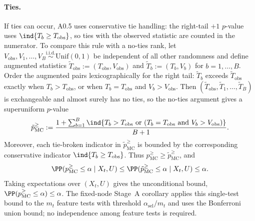 \paragraph{Ties.}
If ties can occur, A0.5 uses conservative tie handling: the right-tail $+1$
$p$-value uses $\ind\{T_b \ge T_{\mathrm{obs}}\}$, so ties with the observed
statistic are counted in the numerator. To compare this rule with a no-ties
rank, let
$V_{\mathrm{obs}},V_1,\dots,V_B \stackrel{\mathrm{i.i.d.}}{\sim}
\mathrm{Unif}(0,1)$ be independent of all other randomness and define augmented
statistics $\tilde{T}_{\mathrm{obs}} := (T_{\mathrm{obs}}, V_{\mathrm{obs}})$
and $\tilde{T}_b := (T_b, V_b)$ for $b=1,\dots,B$. Order the augmented pairs
lexicographically for the right tail: $\tilde{T}_b$ exceeds
$\tilde{T}_{\mathrm{obs}}$ exactly when $T_b > T_{\mathrm{obs}}$, or when
$T_b = T_{\mathrm{obs}}$ and $V_b > V_{\mathrm{obs}}$. Then
$(\tilde{T}_{\mathrm{obs}},\tilde{T}_1,\dots,\tilde{T}_B)$ is exchangeable and
almost surely has no ties, so the no-ties argument gives a superuniform
$p$-value
%
\begin{equation}
  \tilde{p}_{\mathrm{MC}}^{\ge}
  :=
  \frac{
    1 + \sum_{b=1}^B
    \ind\{
      T_b > T_{\mathrm{obs}}
      \text{ or } (T_b = T_{\mathrm{obs}} \text{ and } V_b > V_{\mathrm{obs}})
    \}
  }{B+1}.
\end{equation}
%
Moreover, each tie-broken indicator in $\tilde{p}_{\mathrm{MC}}^{\ge}$ is
bounded by the corresponding conservative indicator
$\ind\{T_b \ge T_{\mathrm{obs}}\}$. Thus
$p_{\mathrm{MC}}^{\ge} \ge \tilde{p}_{\mathrm{MC}}^{\ge}$, and
%
\begin{equation}
  \PP(p_{\mathrm{MC}}^{\ge} \le \alpha \mid X_t,U)
  \le \PP(\tilde{p}_{\mathrm{MC}}^{\ge} \le \alpha \mid X_t,U) \le \alpha.
\end{equation}
%
Taking expectations over $(X_t,U)$ gives the unconditional bound,
$\PP(p_{\mathrm{MC}}^{\ge} \le \alpha) \le \alpha$.
The fixed-node Stage~A corollary applies this single-test bound to the $m_t$
feature tests with threshold $\alpha_{\mathrm{sel}}/m_t$ and uses the Bonferroni
union bound; no independence among feature tests is required.
